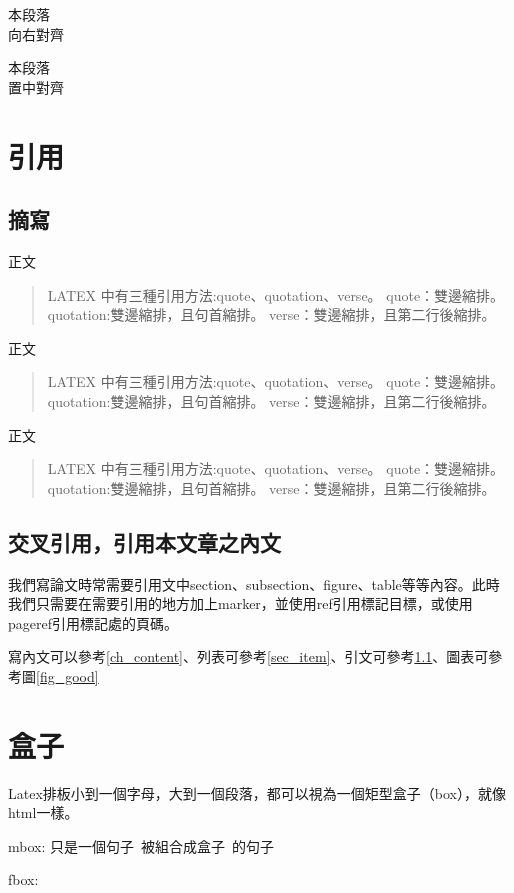 \begin{flushright}
    本段落\\
    向右對齊
\end{flushright}

\begin{center}
    本段落\\
    置中對齊
\end{center}

\section{引用}
\subsection{摘寫}\label{ssec_qute}
正文
\begin{quote}
    LATEX 中有三種引用方法:quote、quotation、verse。
    quote：雙邊縮排。
    quotation:雙邊縮排，且句首縮排。
    verse：雙邊縮排，且第二行後縮排。
\end{quote}
正文
\begin{quotation}
    LATEX 中有三種引用方法:quote、quotation、verse。
    quote：雙邊縮排。
    quotation:雙邊縮排，且句首縮排。
    verse：雙邊縮排，且第二行後縮排。
\end{quotation}
正文
\begin{verse}
    LATEX 中有三種引用方法:quote、quotation、verse。
    quote：雙邊縮排。
    quotation:雙邊縮排，且句首縮排。
    verse：雙邊縮排，且第二行後縮排。
\end{verse}

\subsection{交叉引用，引用本文章之內文}
我們寫論文時常需要引用文中section、subsection、figure、table等等內容。此時我們只需要在需要引用的地方加上marker，並使用ref引用標記目標，或使用pageref引用標記處的頁碼。

寫內文可以參考\ref{ch_content}、列表可參考\ref{sec_item}、引文可參考\ref{ssec_qute}、圖表可參考圖\ref{fig_good}

\newpage
\section{盒子}
Latex排板小到一個字母，大到一個段落，都可以視為一個矩型盒子（box），就像html一樣。

mbox:
\mbox{只是一個句子 被組合成盒子 的句子}

fbox:


